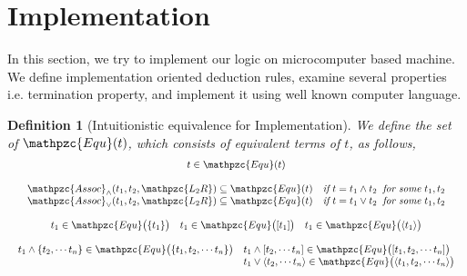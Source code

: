 \documentclass[12pt]{article}
\newtheorem{Definition}{Definition}[section]
\begin{document}
\section*{Implementation}

In this section, we try to implement our logic on microcomputer based
machine. We define implementation oriented deduction rules, examine several
properties i.e. termination property, and implement it using well known
computer language.


\pagebreak
\begin{Definition}[Intuitionistic equivalence for Implementation]
  \label{equality_for_implementation}
  We define the set of $\mathpzc{Equ}(t)$, which consists of equivalent
  terms of $t$, as follows,
  \begin{displaymath}
    \begin{array}{c}
      
      t \in \mathpzc{Equ}(t)  \\
      \\

      \mathpzc{Assoc}_\wedge(t_1, t_2, \mathpzc{L_2R}) \subseteq
       \mathpzc{Equ}(t) \quad \text{\it if}\ t = t_1 \wedge t_2\;\;
        \text{\it for some}\ t_1, t_2 \\
      
      \mathpzc{Assoc}_\vee(t_1, t_2, \mathpzc{L_2R}) \subseteq
       \mathpzc{Equ}(t) \quad \text{\it if}\  t = t_1 \vee t_2\;\;
        \text{\it for some}\ t_1, t_2  \\
      \\

      \begin{array}{lll}
        t_1 \in \mathpzc{Equ}\bigl(\{t_1\} \bigr)
        & t_1 \in \mathpzc{Equ}\bigl([t_1] \bigr)
        & t_1 \in \mathpzc{Equ}\bigl(\langle t_1 \rangle \bigr)
      \end{array}  \\
      \\

      \begin{array}{ll}
        t_1 \wedge \{t_2, \cdots t_n\} \in
        \mathpzc{Equ}\bigl(\{t_1, t_2, \cdots t_n\} \bigr)
        & t_1 \wedge [t_2, \cdots t_n] \in
        \mathpzc{Equ}\bigl([t_1, t_2, \cdots t_n] \bigr)  \\
        & t_1 \vee \langle t_2, \cdots t_n \rangle \in
        \mathpzc{Equ}\bigl(\langle t_1, t_2, \cdots t_n \rangle \bigr)
      \end{array}  \\
      \\
      

\end{array}
\end{displaymath}
\end{Definition}
\end{document}
